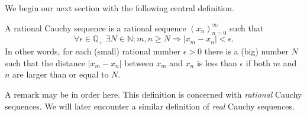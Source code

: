 \documentclass{tstextbook}
\begin{document}
    We begin our next section with the following central definition.

    \begin{definition}
        \label{th:rationalcauchysequence}
        A rational Cauchy sequence is a rational sequence
        $(x_n)_{n=0}^{\infty}$ such that
        \begin{equation}
            \forall \epsilon \in \mathbb{Q}_+ \;
            \exists N \in \mathbb{N} : m, n \geq N \Rightarrow |x_m - x_n| < \epsilon.
        \end{equation}
        In other words, for each (small) rational number $\epsilon > 0$
        there is a (big) number $N$ such that the distance $|x_m - x_n|$
        between $x_m$ and $x_n$ is less than $\epsilon$ if both $m$ and $n$
        are larger than or equal to $N$.
    \end{definition}

    \begin{remark}
        A remark may be in order here. This definition is concerned with
        \emph{rational} Cauchy sequences. We will later encounter a similar
        definition of \emph{real} Cauchy sequences.
    \end{remark}
\end{document}
